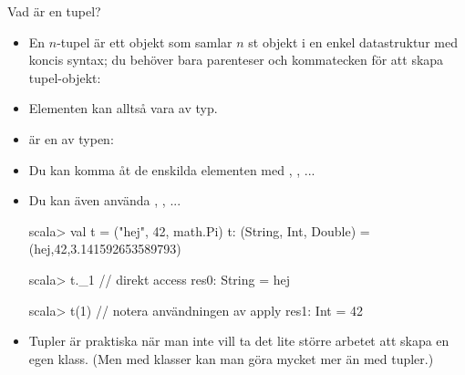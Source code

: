 \begin{Slide}{Vad är en tupel?}\SlideFontSmall

\begin{itemize}
\item En $n$-tupel är ett objekt som samlar $n$ st objekt i en enkel datastruktur med koncis syntax;
du behöver bara parenteser och kommatecken för att skapa tupel-objekt: ~~
\item Elementen kan alltså vara av  typ.

\item
{} är en  av typen: 

\pause

\item Du kan komma åt de enskilda elementen med , , ...  
\item Du kan även använda , , ...  

\begin{REPL}
scala> val t = ("hej", 42, math.Pi)
t: (String, Int, Double) = (hej,42,3.141592653589793)

scala> t._1    // direkt access
res0: String = hej

scala> t(1)    // notera användningen av apply
res1: Int = 42
\end{REPL}

\pause

\item Tupler är praktiska när man inte vill ta det lite större arbetet att skapa en egen klass.
(Men med klasser kan man göra mycket mer än med tupler.)

\end{itemize}

\end{Slide}


